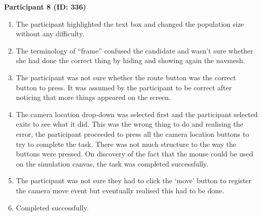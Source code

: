 \textbf{Participant 8 (ID: 336)}
\begin{enumerate}
\item The participant highlighted the text box and changed the population size without any difficulty.
\item The terminology of “frame” confused the candidate and wasn’t sure whether she had done the correct thing by hiding and showing again the navmesh.
\item The participant was not sure whether the route button was the correct button to press. It was assumed by the participant to be correct after noticing that more things appeared on the screen.
\item The camera location drop-down was selected first and the participant selected exits to see what it did. This was the wrong thing to do and realising the error, the participant proceeded to press all the camera location buttons to try to complete the task. There was not much structure to the way the buttons were pressed. On discovery of the fact that the mouse could be used on the simulation canvas, the task was completed successfully.
\item The participant was not sure they had to click the ‘move’ button to register the camera move event but eventually realised this had to be done.
\item Completed successfully.
\end{enumerate}
